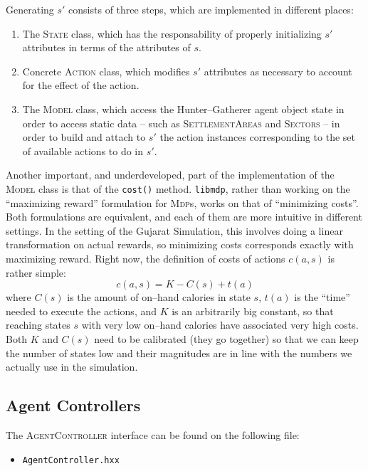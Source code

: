 \documentclass[a4paper,10pt]{article}
\newcommand{\mdps}{\textsc{Mdp}s}
\begin{document}
Generating $s'$ consists of three steps, which are implemented in different places:
\begin{enumerate}
\item The \textsc{State} class, which has the responsability of properly initializing $s'$ attributes in terms of
the attributes of $s$.
\item Concrete \textsc{Action} class, which modifies $s'$ attributes as necessary to account for the effect of
the action.
\item The \textsc{Model} class, which access the Hunter--Gatherer agent object state in order to access static
data -- such as \textsc{SettlementAreas} and \textsc{Sectors} -- in order to build and attach to $s'$ the action
instances corresponding to the set of available actions to do in $s'$. 
\end{enumerate}

Another important, and underdeveloped, part of the implementation of the \textsc{Model} class is that of the
\texttt{cost()} method. \texttt{libmdp}, rather than working on the ``maximizing reward'' formulation for \mdps,
works on that of ``minimizing costs''. Both formulations are equivalent, and each of them are more intuitive
in different settings. In the setting of the Gujarat Simulation, this involves doing a linear transformation
on actual rewards, so minimizing costs corresponds exactly with maximizing reward. Right now, the definition
of costs of actions $c(a,s)$ is rather simple:
\begin{equation*}
c(a,s) = K - C(s) + t(a)
\end{equation*}
where $C(s)$ is the amount of on--hand calories in state $s$, $t(a)$ is the ``time'' needed to execute the actions,
and $K$ is an arbitrarily big constant, so that reaching states $s$ with very low on--hand calories have associated
very high costs. Both $K$ and $C(s)$ need to be calibrated (they go together) so that we can keep the number of
states low and their magnitudes are in line with the numbers we actually use in the simulation.

\subsection{Agent Controllers}

The \textsc{AgentController} interface can be found on the following file:

\begin{itemize}
 \item \texttt{AgentController.hxx}
\end{itemize}
\end{document}

